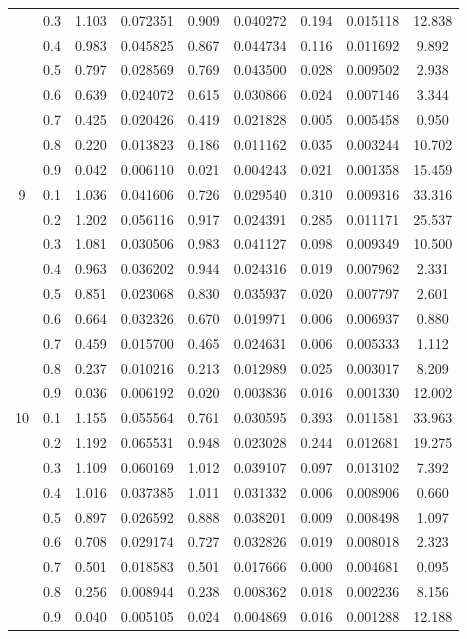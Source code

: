 \begin{longtable}{ | c | c || c | c | c | c | c | c | c | }
 & 0.3 & 1.103 & 0.072351 & 0.909 & 0.040272 & 0.194 & 0.015118 & 12.838 \\
 & 0.4 & 0.983 & 0.045825 & 0.867 & 0.044734 & 0.116 & 0.011692 & 9.892 \\
 & 0.5 & 0.797 & 0.028569 & 0.769 & 0.043500 & 0.028 & 0.009502 & 2.938 \\
 & 0.6 & 0.639 & 0.024072 & 0.615 & 0.030866 & 0.024 & 0.007146 & 3.344 \\
 & 0.7 & 0.425 & 0.020426 & 0.419 & 0.021828 & 0.005 & 0.005458 & 0.950 \\
 & 0.8 & 0.220 & 0.013823 & 0.186 & 0.011162 & 0.035 & 0.003244 & 10.702 \\
 & 0.9 & 0.042 & 0.006110 & 0.021 & 0.004243 & 0.021 & 0.001358 & 15.459 \\
 \hline
\multirow{9}{*}{9} & 0.1 & 1.036 & 0.041606 & 0.726 & 0.029540 & 0.310 & 0.009316 & 33.316 \\
 & 0.2 & 1.202 & 0.056116 & 0.917 & 0.024391 & 0.285 & 0.011171 & 25.537 \\
 & 0.3 & 1.081 & 0.030506 & 0.983 & 0.041127 & 0.098 & 0.009349 & 10.500 \\
 & 0.4 & 0.963 & 0.036202 & 0.944 & 0.024316 & 0.019 & 0.007962 & 2.331 \\
 & 0.5 & 0.851 & 0.023068 & 0.830 & 0.035937 & 0.020 & 0.007797 & 2.601 \\
 & 0.6 & 0.664 & 0.032326 & 0.670 & 0.019971 & 0.006 & 0.006937 & 0.880 \\
 & 0.7 & 0.459 & 0.015700 & 0.465 & 0.024631 & 0.006 & 0.005333 & 1.112 \\
 & 0.8 & 0.237 & 0.010216 & 0.213 & 0.012989 & 0.025 & 0.003017 & 8.209 \\
 & 0.9 & 0.036 & 0.006192 & 0.020 & 0.003836 & 0.016 & 0.001330 & 12.002 \\
 \hline
\multirow{9}{*}{10} & 0.1 & 1.155 & 0.055564 & 0.761 & 0.030595 & 0.393 & 0.011581 & 33.963 \\
 & 0.2 & 1.192 & 0.065531 & 0.948 & 0.023028 & 0.244 & 0.012681 & 19.275 \\
 & 0.3 & 1.109 & 0.060169 & 1.012 & 0.039107 & 0.097 & 0.013102 & 7.392 \\
 & 0.4 & 1.016 & 0.037385 & 1.011 & 0.031332 & 0.006 & 0.008906 & 0.660 \\
 & 0.5 & 0.897 & 0.026592 & 0.888 & 0.038201 & 0.009 & 0.008498 & 1.097 \\
 & 0.6 & 0.708 & 0.029174 & 0.727 & 0.032826 & 0.019 & 0.008018 & 2.323 \\
 & 0.7 & 0.501 & 0.018583 & 0.501 & 0.017666 & 0.000 & 0.004681 & 0.095 \\
 & 0.8 & 0.256 & 0.008944 & 0.238 & 0.008362 & 0.018 & 0.002236 & 8.156 \\
 & 0.9 & 0.040 & 0.005105 & 0.024 & 0.004869 & 0.016 & 0.001288 & 12.188 \\
 \hline
\hline
\end{longtable}
 

